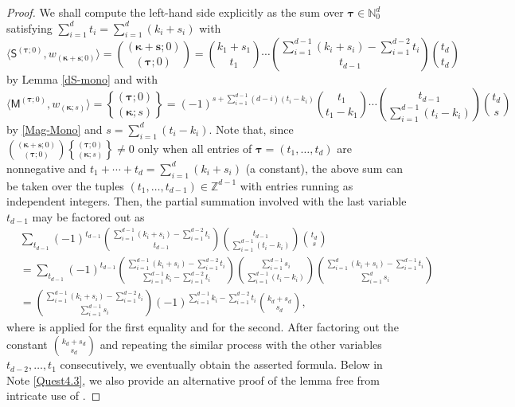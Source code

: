 \documentclass[ALCO,Unicode,published]{cedram}
\DeclareRobustCommand{\magnus}{\genfrac\{\}{0pt}{}}
\def\MM{{\mathsf{M}}}
\def\SS{{\mathsf{S}}}
\def\bs{{\mathbf{s}}}
\def\bkappa{{\boldsymbol \kappa}}
\def\btau{{\boldsymbol \tau}}
\def\N{{\mathbb N}}
\def\Z{{\mathbb Z}}
\def\la{\langle}
\def\ra{\rangle}
\def\bkappa{{\boldsymbol \kappa}}
\begin{document}
\begin{proof}
We shall compute the left-hand side explicitly
as the sum over 
$\btau\in\N_0^d$ satisfying
$\sum_{i=1}^d t_i=\sum_{i=1}^d (k_i+s_i)$
with
$$
\la\SS^{(\btau;0)},w_{(\bkappa+\bs;0)}\ra=\binom{(\bkappa+\bs;0)}{(\btau;0)}
=\binom{k_1+s_1}{t_1} 
\cdots
\binom{\sum_{i=1}^{d-1}(k_i+s_i)-\sum_{i=1}^{d-2}t_i}{t_{d-1}}
\binom{t_d}{t_d}
$$
by Lemma \ref{dS-mono} and with
\small $$
\la\MM^{(\btau;0)}, w_{(\bkappa;s)}\ra
=\magnus{(\btau;0)}{(\bkappa;s)}
=(-1)^{s+\sum_{i=1}^{d-1}(d-i)(t_i-k_i)}
\binom{t_1}{t_1-k_1}
\cdots
\binom{t_{d-1}}{\sum_{i=1}^{d-1}(t_i-k_i)}
\binom{t_d}{s}
$$ \normalsize
by \eqref{Mag-Mono} and
$s=\sum_{i=1}^{d}(t_i-k_i)$. 
Note that,
since $\binom{(\bkappa+\bs;0)}{(\btau;0)}\magnus{(\btau;0)}{(\bkappa;s)}\ne 0$ 
only when all entries of $\btau=(t_1,\dots,t_d)$ are nonnegative
and $t_1+\cdots+t_d=\sum_{i=1}^d (k_i+s_i)$ (a constant),
the above sum
can be taken over the tuples $(t_1,\dots,t_{d-1})\in\Z^{d-1}$
with entries running as independent integers.
Then, the partial summation involved with the last variable 
$t_{d-1}$ may be factored out as
\small \begin{align*}
&\sum_{t_{d-1}}(-1)^{t_{d-1}}
\binom{\sum_{i=1}^{d-1}(k_i+s_i)-\sum_{i=1}^{d-2}t_i}{t_{d-1}}
\binom{t_{d-1}}{\sum_{i=1}^{d-1}(t_i-k_i)}
\binom{t_d}{s} \\
&=\sum_{t_{d-1}}(-1)^{t_{d-1}}
\binom{\sum_{i=1}^{d-1}(k_i+s_i)-\sum_{i=1}^{d-2}t_i}{ \sum_{i=1}^{d-1}k_i-\sum_{i=1}^{d-2}t_i }
\binom{\sum_{i=1}^{d-1} s_i}{\sum_{i=1}^{d-1}(t_i-k_i)}
\binom{\sum_{i=1}^d(k_i+s_i)-\sum_{i=1}^{d-1}t_i}{\sum_{i=1}^{d} s_i} \\
&=\binom{\sum_{i=1}^{d-1}(k_i+s_i)-\sum_{i=1}^{d-2}t_i}{\sum_{i=1}^{d-1} s_i}
(-1)^{\sum_{i=1}^{d-1}k_i -\sum_{i=1}^{d-2} t_i}
\binom{k_d+s_d}{s_d},
\end{align*} \normalsize
where \cite[(5.21)]{GKP} is applied for the first equality and 
\cite[(5.24)]{GKP} for the second.
After factoring out the constant $\binom{k_d+s_d}{s_d}$ and repeating
the similar process with the other variables $t_{d-2},\dots, t_1$ consecutively,
we eventually obtain the asserted formula.
Below in Note \ref{Quest4.3}, we also provide an alternative proof of the lemma 
free from intricate use of 
\cite[(5.21),(5.24)]{GKP}.
\end{proof}
\end{document}
